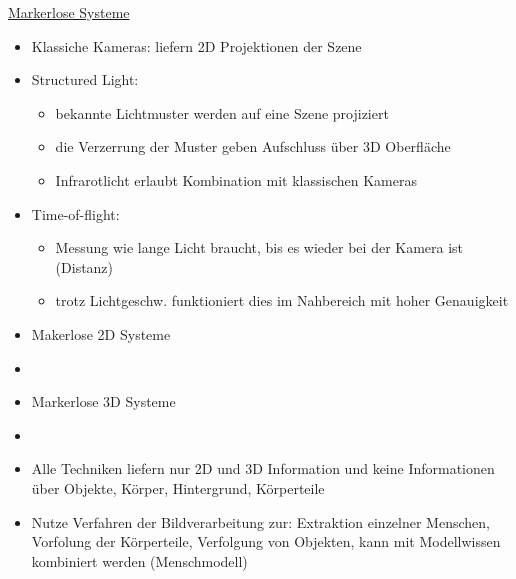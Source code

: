 \documentclass[a4paper,10pt,oneside]{article}
\begin{document}
\underline{Markerlose Systeme} \\
	\begin{itemize}
		\item Klassiche Kameras: liefern 2D Projektionen der Szene
		\item Structured Light:	
			\begin{itemize}
				\item bekannte Lichtmuster werden auf eine Szene projiziert
				\item die Verzerrung der Muster geben Aufschluss über 3D Oberfläche
				\item Infrarotlicht erlaubt Kombination mit klassischen Kameras
			\end{itemize}
		\item Time-of-flight:
			\begin{itemize}
				\item Messung wie lange Licht braucht, bis es wieder bei der Kamera ist (Distanz)
				\item trotz Lichtgeschw. funktioniert dies im Nahbereich mit hoher Genauigkeit
			\end{itemize}
		\item Makerlose 2D Systeme
		\item[] %
		\item Markerlose 3D Systeme
		\item[] %
		\item Alle Techniken liefern nur 2D und 3D Information und keine Informationen über Objekte, Körper, Hintergrund, Körperteile
		\item Nutze Verfahren der Bildverarbeitung zur: Extraktion einzelner Menschen, Vorfolung der Körperteile, Verfolgung von Objekten, kann mit Modellwissen kombiniert werden (Menschmodell)
	\end{itemize}
	
\end{document}
